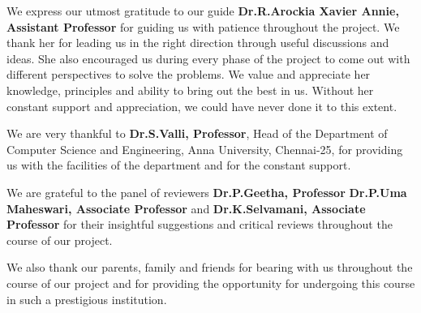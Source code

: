 \par
We express our utmost gratitude to our guide \textbf{Dr.R.Arockia Xavier Annie, Assistant Professor} for guiding us with patience throughout the project. We thank her for leading us in the right direction through useful discussions and ideas. She also encouraged us during every phase of the project to come out with different perspectives to solve the problems. We value and appreciate  her knowledge, principles and ability to bring out the best in us. Without her constant support and appreciation, we could have never done it to this extent.
\par
We are very thankful to \textbf{Dr.S.Valli, Professor}, Head of the Department of Computer Science and Engineering, Anna University, Chennai-25, for providing us with the facilities of the department and for the constant support.
\par
We are grateful to the panel of reviewers \textbf{Dr.P.Geetha, Professor} \textbf{ Dr.P.Uma Maheswari, Associate Professor} and \textbf{Dr.K.Selvamani, Associate Professor} for their insightful suggestions and critical reviews throughout the course of our project.
\par
We also thank our parents, family and friends for bearing with us throughout the course of our project and for providing the opportunity for undergoing this course in such a prestigious institution.
